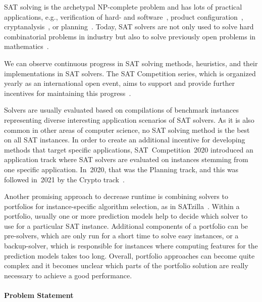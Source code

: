 \documentclass[conference]{IEEEtran}
\begin{document}
SAT solving is the archetypal NP-complete problem and has lots of practical applications, e.g., verification of hard- and software~\cite{Kaufmann:2021:Amulet,Buning:2020:QPRVerify}, product configuration~\cite{Janota:2014:Configuration}, cryptanalysis~\cite{Nejati:2020:CDCLCrypto}, or planning~\cite{Schreiber:2021:Lilotane}. 
Today, SAT solvers are not only used to solve hard combinatorial problems in industry but also to solve previously open problems in mathematics~\cite{Heule:2016:Pyth,Heule:2018:Schur}. 

We can observe continuous progress in SAT solving methods, heuristics, and their implementations in SAT solvers. 
The SAT Competition series, which is organized yearly as an international open event, aims to support and provide further incentives for maintaining this progress~\cite{balyo2020proceedings}.

Solvers are usually evaluated based on compilations of benchmark instances representing diverse interesting application scenarios of SAT solvers.
As it is also common in other areas of computer science, no SAT solving method is the best on all SAT instances. 
In order to create an additional incentive for developing methods that target specific applications, SAT~Competition~2020 introduced an application track where SAT solvers are evaluated on instances stemming from one specific application. 
In~2020, that was the Planning track, and this was followed in~2021 by the Crypto track~\cite{SC2020:AIJ}. 

Another promising approach to decrease runtime is combining solvers to portfolios for instance-specific algorithm selection, as in SATzilla~\cite{xu2008satzilla, xu2012satzilla2012}.
Within a portfolio, usually one or more prediction models help to decide which solver to use for a particular SAT instance. 
Additional components of a portfolio can be pre-solvers, which are only run for a short time to solve easy instances, or a backup-solver, which is responsible for instances where computing features for the prediction models takes too long.
Overall, portfolio approaches can become quite complex and it becomes unclear which parts of the portfolio solution are really necessary to achieve a good performance.

\paragraph{Problem Statement}
\end{document}
